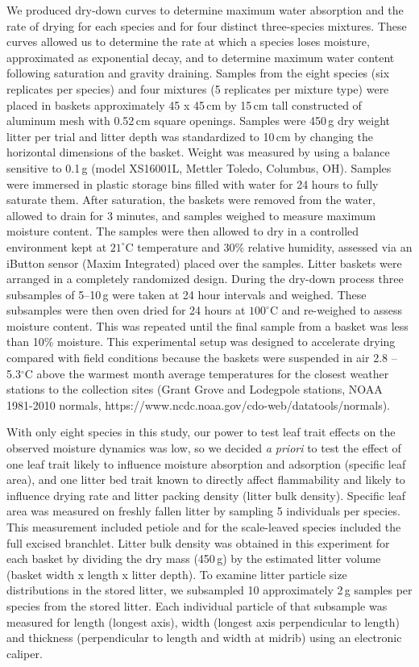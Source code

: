 \documentclass[letterpaper,12pt]{article}
\begin{document}
We produced dry-down curves to determine maximum water absorption and the
rate of drying for each species and for four distinct
three-species mixtures. These curves allowed us to determine the rate at which
a species loses moisture, approximated as exponential decay, and to determine
maximum water content following saturation and gravity draining. Samples from
the eight species (six replicates per species) and four mixtures (5 replicates
per mixture type) were placed in baskets approximately 45 x 45\,cm by 15\,cm
tall constructed of aluminum mesh with 0.52\,cm square openings. Samples were
450\,g dry weight litter per trial and litter depth was standardized to 10\,cm
by changing the horizontal dimensions of the basket. Weight was measured by
using a balance sensitive to 0.1\,g (model XS16001L, Mettler Toledo, Columbus,
OH). Samples were immersed in plastic storage bins filled with water for 24
hours to fully saturate them. After saturation, the baskets were removed from
the water, allowed to drain for 3 minutes, and samples weighed to measure
maximum moisture content. The samples were then allowed to dry in a controlled
environment kept at $21^\circ$C temperature and 30\% relative humidity,
assessed via an iButton sensor (Maxim Integrated) placed over the samples.
Litter baskets were arranged in a completely randomized design. During the
dry-down process three subsamples of 5--10\,g were taken at 24 hour intervals
and weighed. These subsamples were then oven dried for 24 hours at $100^\circ$C
and re-weighed to assess moisture content. This was repeated until the final
sample from a basket was less than 10\% moisture. This experimental setup was
designed to accelerate drying compared with field conditions because the
baskets were suspended in air 2.8 -- 5.3$^\circ$C above the warmest month
average temperatures for the closest weather stations to the collection sites
(Grant Grove and Lodegpole stations, NOAA 1981-2010 normals,
https://www.ncdc.noaa.gov/cdo-web/datatools/normals).


With only eight species in this study, our power to test leaf trait effects on
the observed moisture dynamics was low, so we decided \emph{a priori} to test
the effect of one leaf trait likely to influence moisture absorption and
adsorption (specific leaf area), and one litter bed trait known to directly
affect flammability and likely to influence drying rate and litter packing
density (litter bulk density). Specific leaf area was measured on freshly
fallen litter by sampling 5 individuals per species. This measurement included
petiole and for the scale-leaved species included the full excised branchlet.
Litter bulk density was obtained in this experiment for each basket by dividing
the dry mass (450\,g) by the estimated litter volume (basket width x length x
litter depth). To examine litter particle size distributions in the stored
litter, we subsampled 10 approximately 2\,g samples per species from the stored
litter. Each individual particle of that subsample was measured for length
(longest axis), width (longest axis perpendicular to length) and thickness
(perpendicular to length and width at midrib) using an electronic caliper.
\end{document}
